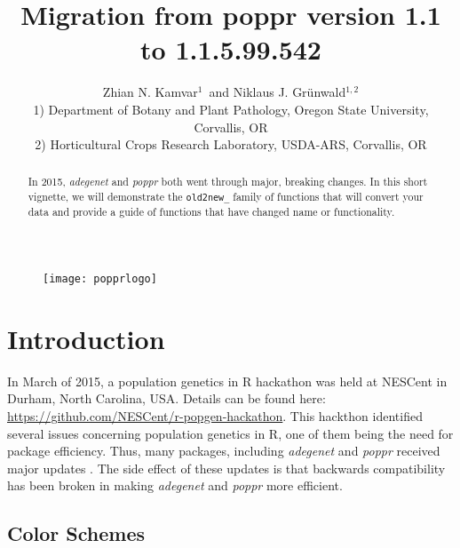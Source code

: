 \documentclass[letterpaper]{article}\usepackage[]{graphicx}\usepackage[]{color}
\title{Migration from poppr version 1.1 to 1.1.5.99.542}
\author{Zhian N. Kamvar$^{1}$\ and Niklaus J. Gr\"unwald$^{1,2}$\\\scriptsize{1)
Department of Botany and Plant Pathology, Oregon State University, Corvallis,
OR}\\\scriptsize{2) Horticultural Crops Research Laboratory, USDA-ARS,
Corvallis, OR}}
\newcommand{\poppr}{\textit{poppr}}
\newcommand{\Poppr}{\textit{Poppr}}
\newcommand{\adegenet}{\textit{adegenet}}
\begin{document}






\maketitle 
\begin{abstract} 
In 2015, \adegenet{} and \poppr{} both went through major, breaking changes.
In this short vignette, we will demonstrate the \texttt{old2new\_} family of
functions that will convert your data and provide a guide of functions that have
changed name or functionality. 
\end{abstract} 

\begin{figure}[b]   
  \centering
  \label{logo}   
  \texttt{[image: popprlogo]} 
\end{figure} 

\newpage 
\begingroup
  \hypersetup{linkcolor=black} 
  \tableofcontents 
\endgroup 

\section{Introduction}

In March of 2015, a population genetics in R hackathon was held at NESCent in 
Durham, North Carolina, USA. Details can be found here: 
\url{https://github.com/NESCent/r-popgen-hackathon}. This hackthon identified 
several issues concerning population genetics in R, one of them being the need
for package efficiency. Thus, many packages, including \adegenet{} and \poppr{}
received major updates \cite{kamvar2015novel}. The side effect of these updates 
is that backwards compatibility has been broken in making \adegenet{} and 
\poppr{} more efficient.

\subsection{Color Schemes}
\end{document}
